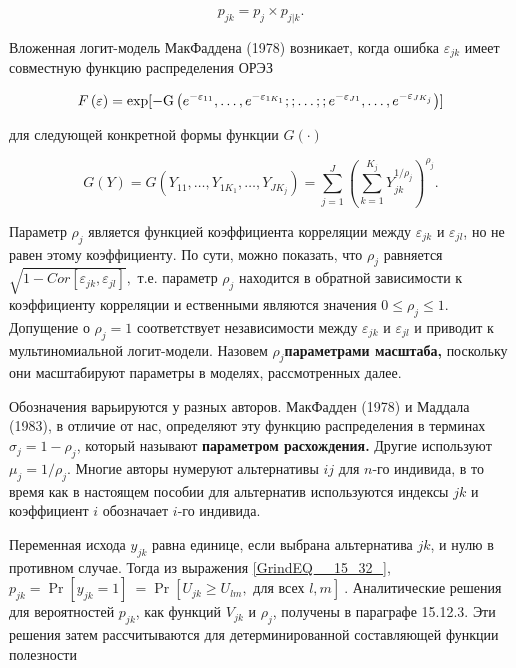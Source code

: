 \[p_{jk}=p_j\times p_{j|k}.\] 

Вложенная логит-модель МакФаддена (1978) возникает, когда ошибка ${\varepsilon }_{jk}$ имеет совместную функцию распределения ОРЭЗ

\begin{equation} \label{GrindEQ__15_33_} F\left(\varepsilon \right)={\rm exp}{\rm [-}{\rm G}\left(e^{-{\varepsilon }_{11}},\dots ,e^{-{\varepsilon }_{1K_1}};;\dots ;;e^{-{\varepsilon }_{J1}},\dots ,e^{-{\varepsilon }_{JK_j}}\right)] \end{equation} 

для следующей конкретной формы функции $G\left(\cdot \right)$

\begin{equation} \label{GrindEQ__15_34_} G\left(Y\right)=G\left(Y_{11},\dots ,Y_{1K_1},\dots ,Y_{JK_j}\right)=\sum^J_{j=1}{{\left(\sum^{K_j}_{k=1}{Y^{{1}/{{\rho }_j}}_{jk}}\right)}^{{\rho }_j}.} \end{equation} 

Параметр ${\rho }_j$ является функцией коэффициента корреляции между ${\varepsilon }_{jk}$ и ${\varepsilon }_{jl}$, но не равен этому коэффициенту. По сути, можно показать, что ${\rho }_j$ равняется $\sqrt{1-Cor[{\varepsilon }_{jk},{\varepsilon }_{jl}]},$ т.е. параметр ${\rho }_j$ находится в обратной зависимости к коэффициенту корреляции и ественными являются значения $0\le {\rho }_j\le 1.$ Допущение о ${\rho }_j=1$ соответствует независимости между ${\varepsilon }_{jk}$ и ${\varepsilon }_{jl}$ и приводит к  мультиномиальной логит-модели. Назовем ${\rho }_j$\textbf{параметрами масштаба, } поскольку они масштабируют параметры в моделях, рассмотренных далее.

Обозначения варьируются у разных авторов. МакФадден (1978) и Маддала (1983), в отличие от нас, определяют эту функцию распределения в терминах ${\sigma }_j=1-{\rho }_j$, который называют \textbf{параметром расхождения. } Другие используют ${\mu }_j={1}/{{\rho }_j}$. Многие авторы нумеруют альтернативы $ij$ для $n$-го индивида, в то время как в настоящем пособии для альтернатив используются индексы $jk$ и коэффициент $i$ обозначает $i$-го индивида.

Переменная исхода $y_{jk}$ равна единице, если выбрана альтернатива $jk$, и нулю в противном случае. Тогда из выражения \eqref{GrindEQ__15_32_}, $p_{jk}={\Pr  \left[y_{jk}=1\right]\ }={\Pr  \left[U_{jk}\ge U_{lm},\text{ для всех } l,m\right]\ }.$ Аналитические решения для вероятностей $p_{jk}$, как функций $V_{jk}$ и ${\rho }_j$, получены в параграфе 15.12.3. Эти решения затем рассчитываются для детерминированной составляющей функции полезности 

